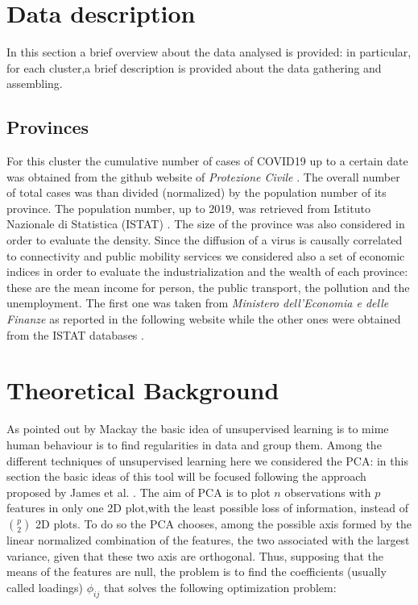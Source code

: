 \documentclass[
12pt, %
a4paper, %
oneside, %
headinclude,footinclude, %
BCOR5mm, %
]{scrartcl}
\begin{document}
\section{Data description} \label{Data_description}
In this section a brief overview about the data analysed is provided: in particular, for each cluster,a brief description is provided  about the data gathering and assembling. 

\subsection{Provinces}
For this cluster the cumulative number of cases of COVID19 up to a certain date was obtained from the github website of \textit{Protezione Civile} \cite{github-protezionecivile}. The overall number of total cases was than divided (normalized) by the population number of its province. The population number, up to 2019, was retrieved from Istituto Nazionale di Statistica (ISTAT) \cite{ISTAT}. The size of the province was also considered in order to evaluate the density. Since the diffusion of a virus is causally correlated to connectivity and public mobility services \cite{lloyd2001viruses,kraemer2020effect} we considered also a set of economic indices in order to evaluate the industrialization and the wealth of each province: these are the mean income for person, the public transport, the pollution and the unemployment. The first one was taken from \textit{Ministero dell'Economia e delle Finanze} as reported in the following website \cite{MEF} while the other ones were obtained from the ISTAT databases \cite{ISTAT}.


\section{Theoretical Background} \label{Theoretical Background}
As pointed out by Mackay \cite{mackay2003information} the basic idea of unsupervised learning is to mime human behaviour is to find regularities in data and group them. Among the different techniques of unsupervised learning \cite{james2013introduction} here we considered the PCA: in this section the basic ideas of this tool will be focused following the approach proposed by James et al. \cite{james2013introduction}. The aim of PCA is to plot $n$ observations with $p$ features in only one 2D plot,with the least possible loss of information, instead of $\binom{p}{2}$ 2D plots. To do so the PCA chooses, among the possible axis formed by the linear normalized combination of the features, the two associated with the largest variance, given that these two axis are orthogonal. Thus, supposing that the means of the features are null, the problem is to find the coefficients (usually called loadings) $\phi_{ij}$ that solves the following optimization problem:
\end{document}
